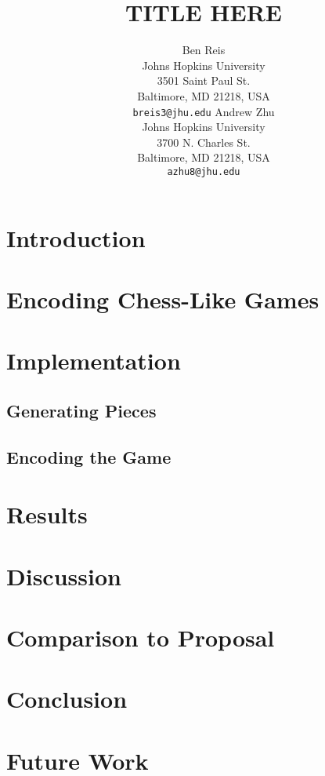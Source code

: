 \documentclass[11pt,letterpaper]{article}
\title{TITLE HERE}
\author{Ben Reis \\
  Johns Hopkins University\\
  3501 Saint Paul St.\\
  Baltimore, MD 21218, USA\\
  {\tt breis3@jhu.edu}
  \And
  Andrew Zhu \\
  Johns Hopkins University \\
  3700 N. Charles St. \\
  Baltimore, MD 21218, USA\\
  {\tt azhu8@jhu.edu}}
\date{}
\begin{document}
\maketitle
\begin{abstract}
\end{abstract}

\section{Introduction}

\section{Encoding Chess-Like Games}
\section{Implementation}
\subsection{Generating Pieces}

\subsection{Encoding the Game}

\section{Results}

\section{Discussion}


\section{Comparison to Proposal}


\section{Conclusion}

\section{Future Work}
\end{document}
